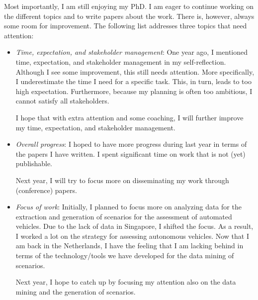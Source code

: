 \documentclass[10pt,final,a4paper,oneside,onecolumn]{article}
\begin{document}
Most importantly, I am still enjoying my PhD. I am eager to continue working on the different topics and to write papers about the work. There is, however, always some room for improvement. The following list addresses three topics that need attention:
\begin{itemize}
	\item \emph{Time, expectation, and stakeholder management}: One year ago, I mentioned time, expectation, and stakeholder management in my self-reflection. Although I see some improvement, this still needs attention. More specifically, I underestimate the time I need for a specific task. This, in turn, leads to too high expectation. Furthermore, because my planning is often too ambitious, I cannot satisfy all stakeholders. 
	
	I hope that with extra attention and some coaching, I will further improve my time, expectation, and stakeholder management.
	
	\item \emph{Overall progress}: I hoped to have more progress during last year in terms of the papers I have written. I spent significant time on work that is not (yet) publishable. 
	
	Next year, I will try to focus more on disseminating my work through (conference) papers. 
	
	\item \emph{Focus of work}: Initially, I planned to focus more on analyzing data for the extraction and generation of scenarios for the assessment of automated vehicles. Due to the lack of data in Singapore, I shifted the focus. As a result, I worked a lot on the strategy for assessing autonomous vehicles. Now that I am back in the Netherlands, I have the feeling that I am lacking behind in terms of the technology/tools we have developed for the data mining of scenarios. 
	
	Next year, I hope to catch up by focusing my attention also on the data mining and the generation of scenarios. 
\end{itemize}




\printbibliography

\clearpage

\end{document}
